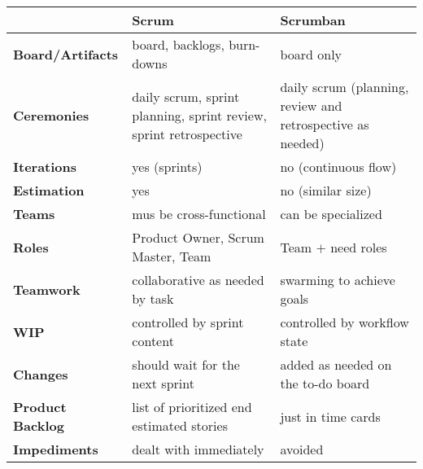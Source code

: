 \documentclass[a4paper]{article}
\begin{document}
    \begin{table}[H]
        \begin{center}
            \begin{tabular}{| p{3cm} | p{6cm} p{6cm} |}
                \toprule
                & \textbf{Scrum} & \textbf{Scrumban}\\
                \toprule

                \cmidrule(r){1-1}\cmidrule(rl){2-2}\cmidrule(l){3-3}
                \textbf{Board/Artifacts} & board, backlogs, burn-downs & board only\\

                \cmidrule(r){1-1}\cmidrule(rl){2-2}\cmidrule(l){3-3}
                \textbf{Ceremonies} & daily scrum, sprint planning, sprint review, sprint retrospective
                & daily scrum (planning, review and retrospective as needed)\\

                \cmidrule(r){1-1}\cmidrule(rl){2-2}\cmidrule(l){3-3}
                \textbf{Iterations} & yes (sprints) & no (continuous flow)\\

                \cmidrule(r){1-1}\cmidrule(rl){2-2}\cmidrule(l){3-3}
                \textbf{Estimation} & yes & no (similar size)\\

                \cmidrule(r){1-1}\cmidrule(rl){2-2}\cmidrule(l){3-3}
                \textbf{Teams} & mus be cross-functional & can be specialized\\

                \cmidrule(r){1-1}\cmidrule(rl){2-2}\cmidrule(l){3-3}
                \textbf{Roles} & Product Owner, Scrum Master, Team & Team $+$ need roles\\

                \cmidrule(r){1-1}\cmidrule(rl){2-2}\cmidrule(l){3-3}
                \textbf{Teamwork} & collaborative as needed by task & swarming to achieve goals\\

                \cmidrule(r){1-1}\cmidrule(rl){2-2}\cmidrule(l){3-3}
                \textbf{WIP} & controlled by sprint content & controlled by workflow state\\

                \cmidrule(r){1-1}\cmidrule(rl){2-2}\cmidrule(l){3-3}
                \textbf{Changes} & should wait for the next sprint & added as needed on the to-do board\\

                \cmidrule(r){1-1}\cmidrule(rl){2-2}\cmidrule(l){3-3}
                \textbf{Product Backlog} & list of prioritized end estimated stories & just in time cards\\

                \cmidrule(r){1-1}\cmidrule(rl){2-2}\cmidrule(l){3-3}
                \textbf{Impediments} & dealt with immediately & avoided\\

                \bottomrule
            \end{tabular}
        \end{center}
    \end{table}
\end{document}
